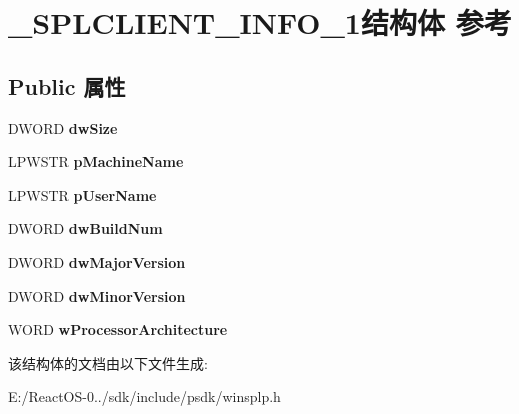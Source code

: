 \hypertarget{struct___s_p_l_c_l_i_e_n_t___i_n_f_o__1}{}\section{\+\_\+\+S\+P\+L\+C\+L\+I\+E\+N\+T\+\_\+\+I\+N\+F\+O\+\_\+1结构体 参考}
\label{struct___s_p_l_c_l_i_e_n_t___i_n_f_o__1}
\subsection*{Public 属性}
\begin{DoxyCompactItemize}
\item 
\mbox{\label{struct___s_p_l_c_l_i_e_n_t___i_n_f_o__1_aecb493b6add9c6bc4e952043be8b8fa5}} 
D\+W\+O\+RD {\bfseries dw\+Size}
\item 
\mbox{\label{struct___s_p_l_c_l_i_e_n_t___i_n_f_o__1_ab2e229a7b3a1600621505fbe3885f996}} 
L\+P\+W\+S\+TR {\bfseries p\+Machine\+Name}
\item 
\mbox{\label{struct___s_p_l_c_l_i_e_n_t___i_n_f_o__1_a259ddd5680ea3baadf17f71fe5d5dab9}} 
L\+P\+W\+S\+TR {\bfseries p\+User\+Name}
\item 
\mbox{\label{struct___s_p_l_c_l_i_e_n_t___i_n_f_o__1_a66741b31914d1d1b3a0d4de680cffc94}} 
D\+W\+O\+RD {\bfseries dw\+Build\+Num}
\item 
\mbox{\label{struct___s_p_l_c_l_i_e_n_t___i_n_f_o__1_a4818fb2c99a5229e2cc15130b96214a3}} 
D\+W\+O\+RD {\bfseries dw\+Major\+Version}
\item 
\mbox{\label{struct___s_p_l_c_l_i_e_n_t___i_n_f_o__1_a970f1277dafd90ba306d4122fa56557e}} 
D\+W\+O\+RD {\bfseries dw\+Minor\+Version}
\item 
\mbox{\label{struct___s_p_l_c_l_i_e_n_t___i_n_f_o__1_aa1d3181947a8192543d569e985ebe898}} 
W\+O\+RD {\bfseries w\+Processor\+Architecture}
\end{DoxyCompactItemize}


该结构体的文档由以下文件生成\+:\begin{DoxyCompactItemize}
\item 
E\+:/\+React\+O\+S-\/0../sdk/include/psdk/winsplp.\+h\end{DoxyCompactItemize}
